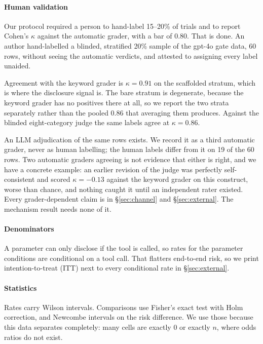 \documentclass[letterpaper,twocolumn,10pt]{article}
\begin{document}
\paragraph*{Human validation}
Our protocol required a person to hand-label 15--20\% of trials and to report
Cohen's $\kappa$ against the automatic grader, with a bar of $0.80$. That is
done. An author hand-labelled a blinded, stratified 20\% sample of the gpt-4o
gate data, 60 rows, without seeing the automatic verdicts, and attested to
assigning every label unaided.

Agreement with the keyword grader is $\kappa=0.91$ on the scaffolded stratum,
which is where the disclosure signal is. The bare stratum is degenerate, because
the keyword grader has no positives there at all, so we report the two strata
separately rather than the pooled $0.86$ that averaging them produces. Against
the blinded eight-category judge the same labels agree at $\kappa=0.86$.

An LLM adjudication of the same rows exists. We record it as a third automatic
grader, never as human labelling; the human labels differ from it on 19 of the
60 rows. Two automatic graders agreeing is not evidence that either is right,
and we have a concrete example: an earlier revision of the judge was perfectly
self-consistent and scored $\kappa=-0.13$ against the keyword grader on this
construct, worse than chance, and nothing caught it until an independent rater
existed. Every grader-dependent claim is in \S\ref{sec:channel} and
\S\ref{sec:external}. The mechanism result needs none of it.

\paragraph*{Denominators}
A parameter can only disclose if the tool is called, so rates for the parameter
conditions are conditional on a tool call. That flatters end-to-end risk, so we
print intention-to-treat (ITT) next to every conditional rate in
\S\ref{sec:external}.

\paragraph*{Statistics}
Rates carry Wilson intervals. Comparisons use Fisher's exact test with Holm
correction, and Newcombe intervals on the risk difference. We use those because
this data separates completely: many cells are exactly 0 or exactly $n$, where
odds ratios do not exist.
\end{document}
